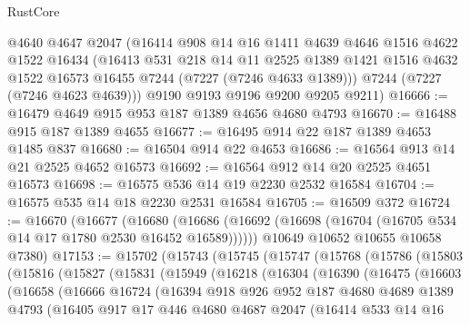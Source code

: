 \begin{lexlean}{RustCore}
\begin{coremodule}
      @4640
      @4647
      @2047
      (@16414
        @908
        @14
        @16
        @1411
        @4639
        @4646
        @1516
        @4622
        @1522
        @16434
        (@16413
          @531
          @218
          @14
          @11
          @2525
          @1389
          @1421
          @1516
          @4632
          @1522
          @16573
          @16455
          @7244
          (@7227 (@7246 @4633 @1389)))
        @7244
        (@7227 (@7246 @4623 @4639)))
      @9190
      @9193
      @9196
      @9200
      @9205
      @9211)
@16666 := @16479 @4649 @915 @953 @187 @1389 @4656 @4680 @4793
@16670 := @16488 @915 @187 @1389 @4655
@16677 := @16495 @914 @22 @187 @1389 @4653 @1485 @837
@16680 := @16504 @914 @22 @4653
@16686 := @16564 @913 @14 @21 @2525 @4652 @16573
@16692 := @16564 @912 @14 @20 @2525 @4651 @16573
@16698 := @16575 @536 @14 @19 @2230 @2532 @16584
@16704 := @16575 @535 @14 @18 @2230 @2531 @16584
@16705 := @16509 @372
@16724 := @16670
    (@16677
      (@16680 (@16686 (@16692 (@16698 (@16704 (@16705 @534 @14 @17 @1780 @2530 @16452 @16589))))))
      @10649
      @10652
      @10655
      @10658
      @7380)
@17153 := @15702
    (@15743
      (@15745
        (@15747
          (@15768
            (@15786
              (@15803
                (@15816
                  (@15827
                    (@15831
                      (@15949
                        (@16218
                          (@16304
                            (@16390
                              (@16475
                                (@16603
                                  (@16658
                                    (@16666
                                      @16724
                                      (@16394
                                        @918
                                        @926
                                        @952
                                        @187
                                        @4680
                                        @4689
                                        @1389
                                        @4793
                                        (@16405
                                          @917
                                          @17
                                          @446
                                          @4680
                                          @4687
                                          @2047
                                          (@16414
                                            @533
                                            @14
                                            @16

\end{coremodule}
\end{lexlean}
